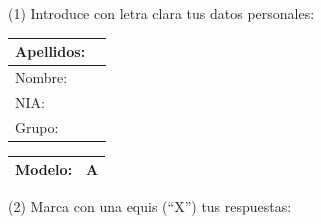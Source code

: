 \documentclass[a4paper,11pt]{article}
\begin{document}
\vspace{0.2cm}


\begin{center}
(1) Introduce con letra clara tus datos personales:
\end{center}

\begin{center}
\large

\begin{tabular}{|l|p{12cm}|}
\hline
Apellidos:   &  \\
\hline
Nombre: &    \\
\hline
NIA: &   \\
\hline
Grupo:   &  \\
\hline
\end{tabular}
\end{center}

\vspace{0.3cm}

\begin{center}
\Huge
\begin{tabular}{|l|c|}
\hline
\textbf{Modelo:} & A\\
\hline
\end{tabular}
\end{center}

\vspace{0.3cm}

\begin{center}
(2) Marca con una equis (``X'') tus respuestas:
\end{center}
\end{document}
